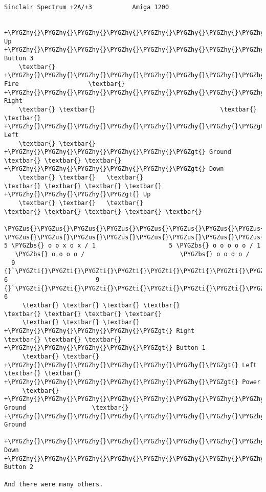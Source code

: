 \documentclass[a4paper,8pt,english]{sphinxmanual}
\def\PYGZbs{\char`\\}
\def\PYGZus{\char`\_}
\def\PYGZgt{\char`\>}
\def\PYGZhy{\char`\-}
\def\PYGZsq{\char`\'}
\def\PYGZti{\char`\~}
\renewcommand\PYGZsq{\textquotesingle}
\begin{document}
\begin{Verbatim}[commandchars=\\\{\}]
        Sinclair Spectrum +2A/+3           Amiga 1200

    +\PYGZhy{}\PYGZhy{}\PYGZhy{}\PYGZhy{}\PYGZhy{}\PYGZhy{}\PYGZhy{}\PYGZhy{}\PYGZhy{}\PYGZhy{}\PYGZhy{}\PYGZgt{} Up                     +\PYGZhy{}\PYGZhy{}\PYGZhy{}\PYGZhy{}\PYGZhy{}\PYGZhy{}\PYGZhy{}\PYGZhy{}\PYGZhy{}\PYGZhy{}\PYGZhy{}\PYGZgt{} Button 3
    \textbar{} +\PYGZhy{}\PYGZhy{}\PYGZhy{}\PYGZhy{}\PYGZhy{}\PYGZhy{}\PYGZhy{}\PYGZhy{}\PYGZhy{}\PYGZgt{} Fire                   \textbar{} +\PYGZhy{}\PYGZhy{}\PYGZhy{}\PYGZhy{}\PYGZhy{}\PYGZhy{}\PYGZhy{}\PYGZhy{}\PYGZhy{}\PYGZgt{} Right
    \textbar{} \textbar{}                                  \textbar{} \textbar{} +\PYGZhy{}\PYGZhy{}\PYGZhy{}\PYGZhy{}\PYGZhy{}\PYGZhy{}\PYGZhy{}\PYGZgt{} Left
    \textbar{} \textbar{}   +\PYGZhy{}\PYGZhy{}\PYGZhy{}\PYGZhy{}\PYGZhy{}\PYGZgt{} Ground                 \textbar{} \textbar{} \textbar{} +\PYGZhy{}\PYGZhy{}\PYGZhy{}\PYGZhy{}\PYGZhy{}\PYGZgt{} Down
    \textbar{} \textbar{}   \textbar{}                              \textbar{} \textbar{} \textbar{} \textbar{} +\PYGZhy{}\PYGZhy{}\PYGZhy{}\PYGZgt{} Up
    \textbar{} \textbar{}   \textbar{}                              \textbar{} \textbar{} \textbar{} \textbar{} \textbar{}
  \PYGZus{}\PYGZus{}\PYGZus{}\PYGZus{}\PYGZus{}\PYGZus{}\PYGZus{}\PYGZus{}\PYGZus{}\PYGZus{}\PYGZus{}\PYGZus{}\PYGZus{}                        \PYGZus{}\PYGZus{}\PYGZus{}\PYGZus{}\PYGZus{}\PYGZus{}\PYGZus{}\PYGZus{}\PYGZus{}\PYGZus{}\PYGZus{}\PYGZus{}\PYGZus{}
5 \PYGZbs{} o o x o x / 1                    5 \PYGZbs{} o o o o o / 1
   \PYGZbs{} o o o o /                          \PYGZbs{} o o o o /
  9 {}`\PYGZti{}\PYGZti{}\PYGZti{}\PYGZti{}\PYGZti{}\PYGZti{}\PYGZti{}\PYGZsq{} 6                        9 {}`\PYGZti{}\PYGZti{}\PYGZti{}\PYGZti{}\PYGZti{}\PYGZti{}\PYGZti{}\PYGZsq{} 6
     \textbar{} \textbar{} \textbar{} \textbar{}                              \textbar{} \textbar{} \textbar{} \textbar{}
     \textbar{} \textbar{} \textbar{} +\PYGZhy{}\PYGZhy{}\PYGZhy{}\PYGZhy{}\PYGZgt{} Right                   \textbar{} \textbar{} \textbar{} +\PYGZhy{}\PYGZhy{}\PYGZhy{}\PYGZhy{}\PYGZgt{} Button 1
     \textbar{} \textbar{} +\PYGZhy{}\PYGZhy{}\PYGZhy{}\PYGZhy{}\PYGZhy{}\PYGZhy{}\PYGZgt{} Left                    \textbar{} \textbar{} +\PYGZhy{}\PYGZhy{}\PYGZhy{}\PYGZhy{}\PYGZhy{}\PYGZhy{}\PYGZgt{} Power
     \textbar{} +\PYGZhy{}\PYGZhy{}\PYGZhy{}\PYGZhy{}\PYGZhy{}\PYGZhy{}\PYGZhy{}\PYGZhy{}\PYGZgt{} Ground                  \textbar{} +\PYGZhy{}\PYGZhy{}\PYGZhy{}\PYGZhy{}\PYGZhy{}\PYGZhy{}\PYGZhy{}\PYGZhy{}\PYGZgt{} Ground
     +\PYGZhy{}\PYGZhy{}\PYGZhy{}\PYGZhy{}\PYGZhy{}\PYGZhy{}\PYGZhy{}\PYGZhy{}\PYGZhy{}\PYGZhy{}\PYGZgt{} Down                    +\PYGZhy{}\PYGZhy{}\PYGZhy{}\PYGZhy{}\PYGZhy{}\PYGZhy{}\PYGZhy{}\PYGZhy{}\PYGZhy{}\PYGZhy{}\PYGZgt{} Button 2

And there were many others.
\end{Verbatim}
\end{document}
